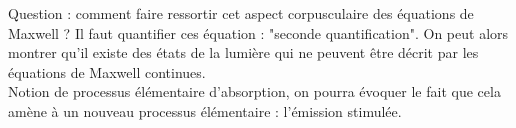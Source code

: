 \documentclass[12pt,prb,aps,epsf]{article}
\begin{document}
Question : comment faire ressortir cet aspect corpusculaire des équations de Maxwell ? Il faut quantifier ces équation : "seconde quantification". On peut alors montrer qu'il existe des états de la lumière qui ne peuvent être décrit par les équations de Maxwell continues.\\

Notion de processus élémentaire d'absorption, on pourra évoquer le fait que cela amène à un nouveau processus élémentaire : l'émission stimulée.
\end{document}
